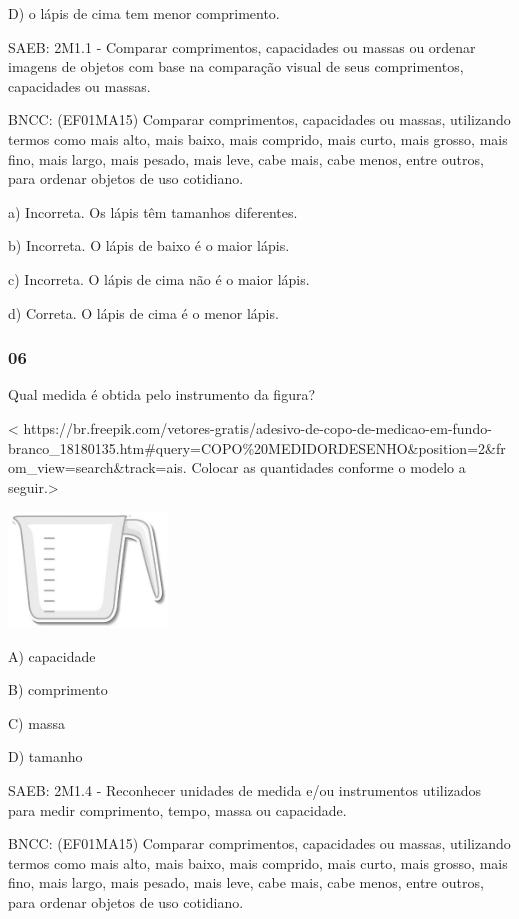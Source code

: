 D) o lápis de cima tem menor comprimento.

SAEB: 2M1.1 - Comparar comprimentos, capacidades ou massas ou ordenar
imagens de objetos com base na comparação visual de seus comprimentos,
capacidades ou massas.

BNCC: (EF01MA15) Comparar comprimentos, capacidades ou massas,
utilizando termos como mais alto, mais baixo, mais comprido, mais curto,
mais grosso, mais fino, mais largo, mais pesado, mais leve, cabe mais,
cabe menos, entre outros, para ordenar objetos de uso cotidiano.

a) Incorreta. Os lápis têm tamanhos diferentes.

b) Incorreta. O lápis de baixo é o maior lápis.

c) Incorreta. O lápis de cima não é o maior lápis.

d) Correta. O lápis de cima é o menor lápis.

\subsubsection{06}\label{section-92}

Qual medida é obtida pelo instrumento da figura?

\textless{}
https://br.freepik.com/vetores-gratis/adesivo-de-copo-de-medicao-em-fundo-branco\_18180135.htm\#query=COPO\%20MEDIDORDESENHO\&position=2\&from\_view=search\&track=ais.
Colocar as quantidades conforme o modelo a seguir.\textgreater{}

\includegraphics[width=1.66282in,height=1.21657in]{media/image107.jpg}

A) capacidade

B) comprimento

C) massa

D) tamanho

SAEB: 2M1.4 - Reconhecer unidades de medida e/ou instrumentos utilizados
para medir comprimento, tempo, massa ou capacidade.

BNCC: (EF01MA15) Comparar comprimentos, capacidades ou massas,
utilizando termos como mais alto, mais baixo, mais comprido, mais curto,
mais grosso, mais fino, mais largo, mais pesado, mais leve, cabe mais,
cabe menos, entre outros, para ordenar objetos de uso cotidiano.

